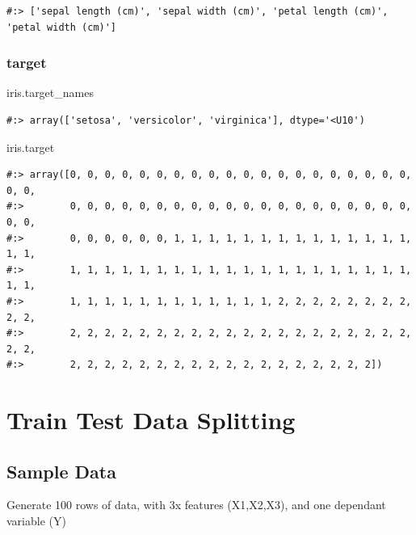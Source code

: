 \documentclass[
]{book}
\newenvironment{Shaded}{\begin{snugshade}}{\end{snugshade}}
\newcommand{\NormalTok}[1]{#1}
\begin{document}
\begin{verbatim}
#:> ['sepal length (cm)', 'sepal width (cm)', 'petal length (cm)', 'petal width (cm)']
\end{verbatim}

\hypertarget{target}{%
\subsubsection{target}\label{target}}

\begin{Shaded}
\begin{Highlighting}[]
\NormalTok{iris.target_names}
\end{Highlighting}
\end{Shaded}

\begin{verbatim}
#:> array(['setosa', 'versicolor', 'virginica'], dtype='<U10')
\end{verbatim}

\begin{Shaded}
\begin{Highlighting}[]
\NormalTok{iris.target}
\end{Highlighting}
\end{Shaded}

\begin{verbatim}
#:> array([0, 0, 0, 0, 0, 0, 0, 0, 0, 0, 0, 0, 0, 0, 0, 0, 0, 0, 0, 0, 0, 0,
#:>        0, 0, 0, 0, 0, 0, 0, 0, 0, 0, 0, 0, 0, 0, 0, 0, 0, 0, 0, 0, 0, 0,
#:>        0, 0, 0, 0, 0, 0, 1, 1, 1, 1, 1, 1, 1, 1, 1, 1, 1, 1, 1, 1, 1, 1,
#:>        1, 1, 1, 1, 1, 1, 1, 1, 1, 1, 1, 1, 1, 1, 1, 1, 1, 1, 1, 1, 1, 1,
#:>        1, 1, 1, 1, 1, 1, 1, 1, 1, 1, 1, 1, 2, 2, 2, 2, 2, 2, 2, 2, 2, 2,
#:>        2, 2, 2, 2, 2, 2, 2, 2, 2, 2, 2, 2, 2, 2, 2, 2, 2, 2, 2, 2, 2, 2,
#:>        2, 2, 2, 2, 2, 2, 2, 2, 2, 2, 2, 2, 2, 2, 2, 2, 2, 2])
\end{verbatim}

\hypertarget{train-test-data-splitting}{%
\section{Train Test Data Splitting}\label{train-test-data-splitting}}

\hypertarget{sample-data-20}{%
\subsection{Sample Data}\label{sample-data-20}}

Generate 100 rows of data, with 3x features (X1,X2,X3), and one dependant variable (Y)
\end{document}
